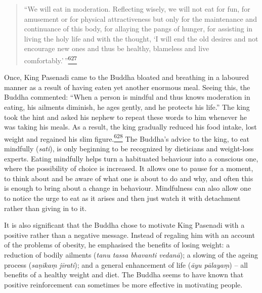 \begin{quote}
``We will eat in moderation. Reflecting wisely, we will not eat for fun,
for amusement or for physical attractiveness but only for the
maintenance and continuance of this body, for allaying the pangs of
hunger, for assisting in living the holy life and with the thought, `I
will end the old desires and not encourage new ones and thus be healthy,
blameless and live
comfortably.'\,''\label{footprints_split_015.html_fnref627}\hyperref[footprints_split_025.htmlux5cux23fn627]{\textsuperscript{627}}
\end{quote}

Once, King Pasenadi came to the Buddha bloated and breathing in a
laboured manner as a result of having eaten yet another enormous meal.
Seeing this, the Buddha commented: ``When a person is mindful and thus
knows moderation in eating, his ailments diminish, he ages gently, and
he protects his life.'' The king took the hint and asked his nephew to
repeat these words to him whenever he was taking his meals. As a result,
the king gradually reduced his food intake, lost weight and regained his
slim
figure.\label{footprints_split_015.html_fnref628}\hyperref[footprints_split_025.htmlux5cux23fn628]{\textsuperscript{628}}
The Buddha's advice to the king, to eat mindfully (\emph{sati}), is only
beginning to be recognized by dieticians and weight-loss experts. Eating
mindfully helps turn a habituated behaviour into a conscious one, where
the possibility of choice is increased. It allows one to pause for a
moment, to think about and be aware of what one is about to do and why,
and often this is enough to bring about a change in behaviour.
Mindfulness can also allow one to notice the urge to eat as it arises
and then just watch it with detachment rather than giving in to it.

It is also significant that the Buddha chose to motivate King Pasenadi
with a positive rather than a negative message. Instead of regaling him
with an account of the problems of obesity, he emphasised the benefits
of losing weight: a reduction of bodily ailments (\emph{tanu tassa
bhavanti vedanā}); a slowing of the ageing process (\emph{saṇikaṃ
jīrati}); and a general enhancement of life (\emph{āyu pālayaṃ}) -- all
benefits of a healthy weight and diet. The Buddha seems to have known
that positive reinforcement can sometimes be more effective in
motivating people.

